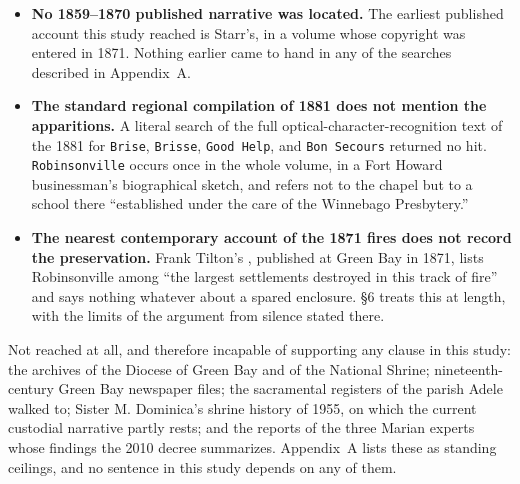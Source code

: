 \begin{itemize}
\item \textbf{No 1859--1870 published narrative was located.} The
earliest published account this study reached is Starr's, in a volume
whose copyright was entered in 1871. Nothing earlier came to hand in
any of the searches described in Appendix~A.
\item \textbf{The standard regional compilation of 1881 does not
mention the apparitions.} A literal search of the full
optical-character-recognition text of the 1881  for \texttt{Brise}, \texttt{Brisse}, \texttt{Good Help}, and
\texttt{Bon Secours} returned no hit. \texttt{Robinsonville} occurs
once in the whole volume, in a Fort Howard businessman's biographical
sketch, and refers not to the chapel but to a school there ``established
under the care of the Winnebago Presbytery.''
\item \textbf{The nearest contemporary account of the 1871 fires does
not record the preservation.} Frank Tilton's , published at Green Bay in 1871, lists
Robinsonville among ``the largest settlements destroyed in this track
of fire'' and says nothing whatever about a spared enclosure. \S6
treats this at length, with the limits of the argument from silence
stated there.
\end{itemize}

Not reached at all, and therefore incapable of supporting any clause in
this study: the archives of the Diocese of Green Bay and of the
National Shrine; nineteenth-century Green Bay newspaper files; the
sacramental registers of the parish Adele walked to; Sister M.
Dominica's shrine history of 1955, on which the current custodial
narrative partly rests; and the reports of the three Marian experts
whose findings the 2010 decree summarizes. Appendix~A lists these as
standing ceilings, and no sentence in this study depends on any of
them.

